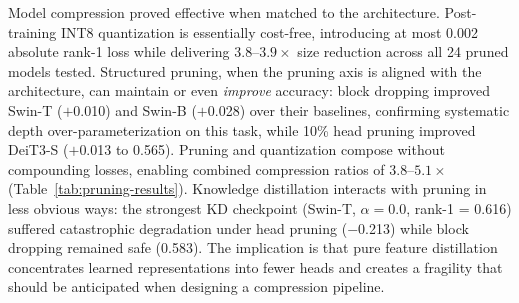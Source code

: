 \documentclass[runningheads,a4paper]{llncs}
\begin{document}
Model compression proved effective when matched to the architecture. Post-training INT8 quantization is essentially cost-free, introducing at most 0.002 absolute rank-1 loss while delivering $3.8$--$3.9\times$ size reduction across all 24 pruned models tested. Structured pruning, when the pruning axis is aligned with the architecture, can maintain or even \emph{improve} accuracy: block dropping improved Swin-T ($+$0.010) and Swin-B ($+$0.028) over their baselines, confirming systematic depth over-parameterization on this task, while 10\% head pruning improved DeiT3-S ($+$0.013 to 0.565). Pruning and quantization compose without compounding losses, enabling combined compression ratios of $3.8$--$5.1\times$ (Table~\ref{tab:pruning-results}). Knowledge distillation interacts with pruning in less obvious ways: the strongest KD checkpoint (Swin-T, $\alpha{=}0.0$, rank-1 = 0.616) suffered catastrophic degradation under head pruning ($-$0.213) while block dropping remained safe (0.583). The implication is that pure feature distillation concentrates learned representations into fewer heads and creates a fragility that should be anticipated when designing a compression pipeline.
\end{document}
